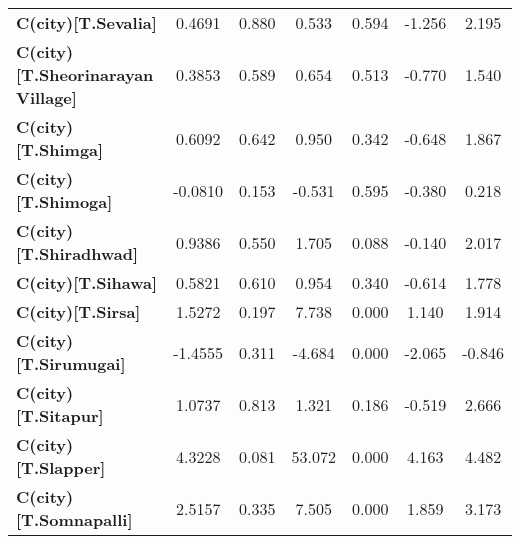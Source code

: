 \begin{center}
\begin{tabular}{lcccccc}
\textbf{C(city)[T.Sevalia]}                                                                         &       0.4691  &        0.880     &     0.533  &         0.594        &       -1.256    &        2.195     \\
\textbf{C(city)[T.Sheorinarayan Village]}                                                           &       0.3853  &        0.589     &     0.654  &         0.513        &       -0.770    &        1.540     \\
\textbf{C(city)[T.Shimga]}                                                                          &       0.6092  &        0.642     &     0.950  &         0.342        &       -0.648    &        1.867     \\
\textbf{C(city)[T.Shimoga]}                                                                         &      -0.0810  &        0.153     &    -0.531  &         0.595        &       -0.380    &        0.218     \\
\textbf{C(city)[T.Shiradhwad]}                                                                      &       0.9386  &        0.550     &     1.705  &         0.088        &       -0.140    &        2.017     \\
\textbf{C(city)[T.Sihawa]}                                                                          &       0.5821  &        0.610     &     0.954  &         0.340        &       -0.614    &        1.778     \\
\textbf{C(city)[T.Sirsa]}                                                                           &       1.5272  &        0.197     &     7.738  &         0.000        &        1.140    &        1.914     \\
\textbf{C(city)[T.Sirumugai]}                                                                       &      -1.4555  &        0.311     &    -4.684  &         0.000        &       -2.065    &       -0.846     \\
\textbf{C(city)[T.Sitapur]}                                                                         &       1.0737  &        0.813     &     1.321  &         0.186        &       -0.519    &        2.666     \\
\textbf{C(city)[T.Slapper]}                                                                         &       4.3228  &        0.081     &    53.072  &         0.000        &        4.163    &        4.482     \\
\textbf{C(city)[T.Somnapalli]}                                                                      &       2.5157  &        0.335     &     7.505  &         0.000        &        1.859    &        3.173     \\

\end{tabular}
\end{center}
